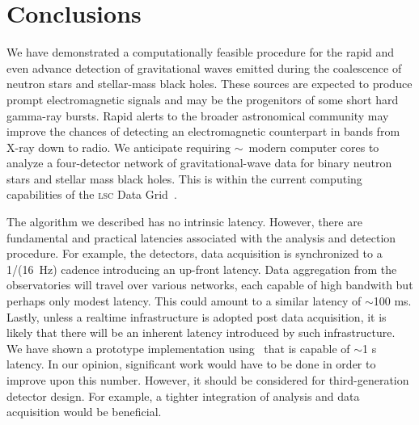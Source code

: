 \section{Conclusions}
\label{SECV}\label{sec:conclusions}

%
We have demonstrated a computationally feasible procedure for the rapid and even advance
detection of gravitational waves emitted during the coalescence of neutron
stars and stellar-mass black holes.  These sources are expected to produce
prompt electromagnetic signals and may be the progenitors of some short hard
gamma-ray bursts.  Rapid alerts to the broader astronomical community may
improve the chances of detecting an electromagnetic counterpart in bands from
X-ray down to radio.  We anticipate requiring $\sim$\numcpus\ modern
%
%
%
computer cores to analyze a four-detector network of gravitational-wave data
for binary neutron stars and stellar mass black holes.  This is within the
current computing capabilities of the \textsc{lsc} Data Grid~\cite{LDG}.

The algorithm we described has no intrinsic latency.  However, there are
fundamental and practical latencies associated with the analysis and detection
procedure. For example, the \LIGO{} detectors, data acquisition is synchronized
to a 1/(16~Hz) cadence introducing an up-front latency.  Data
aggregation from the observatories will travel over various networks, each
capable of high bandwith but perhaps only modest latency.  This could amount to
a similar latency of $\sim$100 ms.  Lastly, unless a realtime infrastructure is
adopted post data acquisition, it is likely that there will be an inherent
latency introduced by such infrastructure.  We have shown a prototype
implementation using \gstlal\ that is capable of $\sim$1 s latency. In our
opinion, significant work would have to be done in order to improve upon this
number. However, it should be considered for third-generation detector design.
For example, a tighter integration of analysis and data acquisition would be
beneficial.

